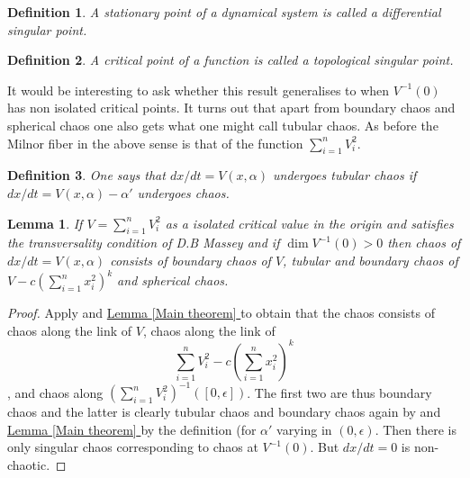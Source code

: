 \documentclass[10pt,a4paper]{amsart}
\newtheorem{lemma}{Lemma}[theorem]
\newtheorem{definition}{Definition}
\begin{document}
\begin{definition}
    A stationary point of a dynamical system is called a differential singular point.
\end{definition}

\begin{definition}
    A critical point of a function is called a topological singular point. 
\end{definition}

It would be interesting to ask whether this result generalises to when $V^{-1}(0)$ has non isolated critical points. It turns out that apart from boundary chaos and spherical chaos one also gets what one might call tubular chaos. As before the Milnor fiber in the above sense is that of the function $\sum_{i=1}^n V_i^2$.

\begin{definition}
    One says that $dx/dt=V(x, \alpha)$ undergoes tubular chaos if $dx/dt=V(x, \alpha)-\alpha'$ undergoes chaos. 
\end{definition}


\begin{lemma}
    If $V=\sum_{i=1}^n V_i^2$ as a isolated critical value in the origin and satisfies the transversality condition of D.B Massey and if $\dim V^{-1}(0)>0$ then chaos of $dx/dt=V(x, \alpha)$ consists of boundary chaos of $V$, tubular and boundary chaos of $V-c(\sum_{i=1}^n x_i^2)^k$ and spherical chaos.
\end{lemma}

\begin{proof}
    Apply \cite[Theorem 2]{LarsIV} and \hyperref[Main theorem]{Lemma \ref*{Main theorem} } to obtain that the chaos consists of chaos along the link of $V$, chaos along the link of 
    $$\sum_{i=1}^n V_i^2 - c(\sum_{i=1}^n x_i^2)^k$$, 
    and chaos along $(\sum_{i=1}^n V_i^2)^{-1}([0, \epsilon])$. The first two are thus boundary chaos and the latter is clearly tubular chaos and boundary chaos again by \cite[Theorem 2]{LarsIV} and \hyperref[Main theorem]{Lemma \ref*{Main theorem} } by the definition (for $\alpha'$ varying in $(0, \epsilon)$. Then there is only singular chaos corresponding to chaos at $V^{-1}(0)$. But $dx/dt=0$ is non-chaotic.
\end{proof}
\end{document}
